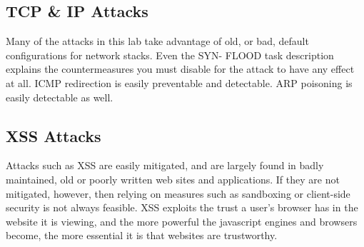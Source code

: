 \subsection{TCP \& IP Attacks}

Many of the attacks in this lab take advantage of old, or bad, default configurations for network stacks. Even the SYN-
FLOOD task description explains the countermeasures you must disable for the attack to have any effect at all. ICMP
redirection is easily preventable and detectable. ARP poisoning is easily detectable as well.

\subsection{XSS Attacks}

Attacks such as XSS are easily mitigated\cite{cheatsheet}, and are largely found in badly maintained, old or poorly
written web sites and applications. If they are not mitigated, however, then relying on measures such as sandboxing or
client-side security is not always feasible. XSS exploits the trust a user's browser has in the website it is viewing,
and the more powerful the javascript engines and browsers  become, the more essential it is that websites are
trustworthy.
